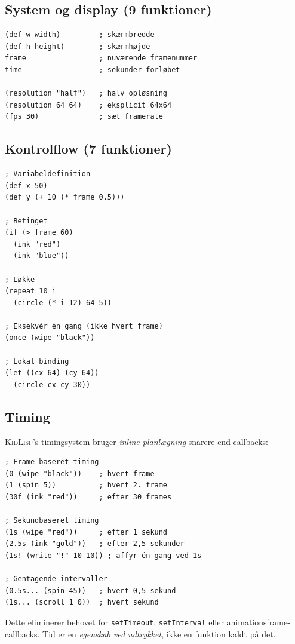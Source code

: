 \documentclass[10pt,letterpaper,twocolumn]{article}
\newcommand{\kl}{\textsc{KidLisp}}
\begin{document}
\subsection{System og display (9 funktioner)}

\begin{lstlisting}
(def w width)         ; skærmbredde
(def h height)        ; skærmhøjde
frame                 ; nuværende framenummer
time                  ; sekunder forløbet

(resolution "half")   ; halv opløsning
(resolution 64 64)    ; eksplicit 64x64
(fps 30)              ; sæt framerate
\end{lstlisting}

\subsection{Kontrolflow (7 funktioner)}

\begin{lstlisting}
; Variabeldefinition
(def x 50)
(def y (+ 10 (* frame 0.5)))

; Betinget
(if (> frame 60)
  (ink "red")
  (ink "blue"))

; Løkke
(repeat 10 i
  (circle (* i 12) 64 5))

; Eksekvér én gang (ikke hvert frame)
(once (wipe "black"))

; Lokal binding
(let ((cx 64) (cy 64))
  (circle cx cy 30))
\end{lstlisting}

\subsection{Timing}

\kl{}'s timingsystem bruger \emph{inline-planlægning} snarere end callbacks:

\begin{lstlisting}
; Frame-baseret timing
(0 (wipe "black"))    ; hvert frame
(1 (spin 5))          ; hvert 2. frame
(30f (ink "red"))     ; efter 30 frames

; Sekundbaseret timing
(1s (wipe "red"))     ; efter 1 sekund
(2.5s (ink "gold"))   ; efter 2,5 sekunder
(1s! (write "!" 10 10)) ; affyr én gang ved 1s

; Gentagende intervaller
(0.5s... (spin 45))   ; hvert 0,5 sekund
(1s... (scroll 1 0))  ; hvert sekund
\end{lstlisting}

Dette eliminerer behovet for \texttt{setTimeout}, \texttt{setInterval} eller animationsframe-callbacks. Tid er en \emph{egenskab ved udtrykket}, ikke en funktion kaldt på det.
\end{document}
